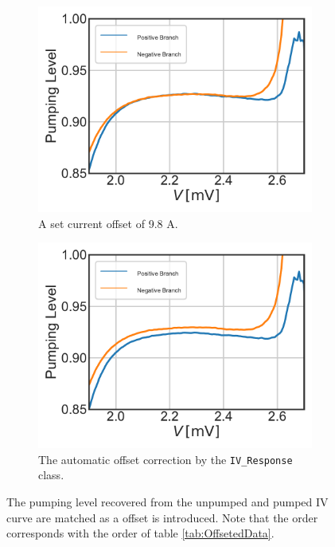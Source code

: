 \documentclass[]{article}
\begin{document}
\begin{figure}
	\begin{subfigure}[t]{0.49\textwidth}
		\centering
		\includegraphics[width=\linewidth]{./../Mixer_Unit_Test/2020_01_16_IVOffsetGausMask_9.8uA/Pumping_Level_Zoom.pdf}
		\caption{A set current offset of 9.8 \textmu A.}
	\end{subfigure}
	\begin{subfigure}[t]{0.49\textwidth}
		\centering
		\includegraphics[width=\linewidth]{./../Mixer_Unit_Test/2020_01_14_Fixed_Mask_iLOfix/Pumping_Level_Zoom.pdf}
		\caption{The automatic offset correction by the \texttt{IV\_Response} class. }
	\end{subfigure}
	\caption[]{The pumping level recovered from the unpumped and pumped IV curve are matched as a offset is introduced. Note that the order corresponds with the order of table \ref{tab:OffsetedData}.
	}
	\label{fig:OffsetedPumpingLevels}
\end{figure}
\end{document}
